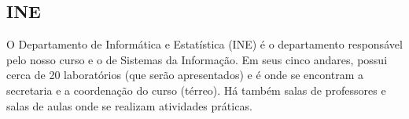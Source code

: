 \subsection{INE}
O Departamento de Informática e Estatística (INE) é o departamento responsável pelo nosso curso e o de Sistemas da Informação. Em seus cinco andares, possui cerca de 20 laboratórios (que serão apresentados) e é onde se encontram a secretaria e a coordenação do curso (térreo). Há também salas de professores e salas de aulas onde se realizam atividades práticas.
